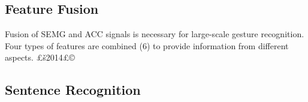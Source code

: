 \documentclass[10pt, conference, letterpaper]{IEEEtran}
\begin{document}
\subsection{Feature Fusion}
Fusion of SEMG and ACC signals is necessary for large-scale gesture recognition. Four types of features are combined (6) to provide information from different aspects. £š2014£©


\subsection{Sentence Recognition}








\end{document}
